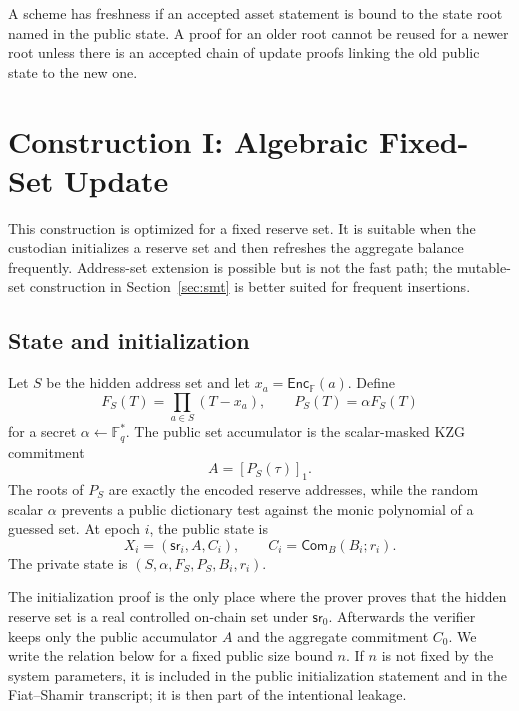 \documentclass[runningheads]{llncs}
\newcommand{\F}{\mathbb{F}}
\newcommand{\Enc}{\mathsf{Enc}}
\newcommand{\Com}{\mathsf{Com}}
\newcommand{\sr}{\mathsf{sr}}
\begin{document}
\begin{definitionx}[Freshness]
A scheme has freshness if an accepted asset statement is bound to the state root named in the public state.  A proof for an older root cannot be reused for a newer root unless there is an accepted chain of update proofs linking the old public state to the new one.
\end{definitionx}

\section{Construction I: Algebraic Fixed-Set Update}

This construction is optimized for a fixed reserve set.  It is suitable when the custodian initializes a reserve set and then refreshes the aggregate balance frequently.  Address-set extension is possible but is not the fast path; the mutable-set construction in Section~\ref{sec:smt} is better suited for frequent insertions.

\subsection{State and initialization}

Let \(S\) be the hidden address set and let \(x_a=\Enc_{\F}(a)\).  Define
\[
        F_S(T)=\prod_{a\in S}(T-x_a),\qquad P_S(T)=\alpha F_S(T)
\]
for a secret \(\alpha\leftarrow\F_q^*\).  The public set accumulator is the scalar-masked KZG commitment
\[
        A=[P_S(\tau)]_1.
\]
The roots of \(P_S\) are exactly the encoded reserve addresses, while the random scalar \(\alpha\) prevents a public dictionary test against the monic polynomial of a guessed set.  At epoch \(i\), the public state is
\[
        X_i=(\sr_i,A,C_i),\qquad C_i=\Com_B(B_i;r_i).
\]
The private state is \((S,\alpha,F_S,P_S,B_i,r_i)\).

The initialization proof is the only place where the prover proves that the hidden reserve set is a real controlled on-chain set under \(\sr_0\).  Afterwards the verifier keeps only the public accumulator \(A\) and the aggregate commitment \(C_0\).  We write the relation below for a fixed public size bound \(n\).  If \(n\) is not fixed by the system parameters, it is included in the public initialization statement and in the Fiat--Shamir transcript; it is then part of the intentional leakage.
\end{document}
